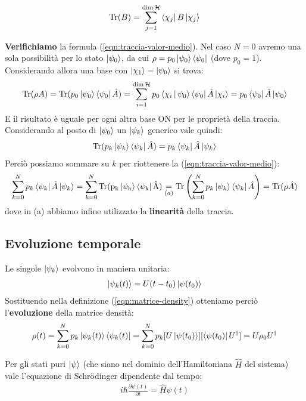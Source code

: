 \documentclass[../../InformazioneQuantistica.tex]{subfiles}
\begin{document}
\begin{align*}
\operatorname{Tr}(B)=\sum_{j=1}^{\operatorname{dim}\mathcal{H}} \Bra{\chi_j}B\Ket{\chi_j}
\end{align*}
\begin{expl}
\textbf{Verifichiamo} la formula (\ref{eqn:traccia-valor-medio}). Nel caso $N=0$ avremo una sola possibilità per lo stato $\Ket{\psi_0}$, da cui $\rho = p_0\Ket{\psi_0}\Bra{\psi_0}$ (dove $p_0=1$). Considerando allora una base con $\Ket{\chi_1} = \Ket{\psi_0}$ si trova:
\begin{align*}
\operatorname{Tr}(\rho A) =
\operatorname{Tr}(p_0\Ket{\psi_0}\Bra{\psi_0}\hat{A})=\sum_{i=1}^{\operatorname{dim}\mathcal{H}}p_0 \Braket{\chi_i|\psi_0}\Bra{\psi_0}\hat{A}\Ket{\chi_i}=p_0 \Bra{\psi_0}\hat{A}\Ket{\psi_0}
\end{align*} 
E il risultato è uguale per ogni altra base ON per le proprietà della traccia. Considerando al posto di $\Ket{\psi_0}$ un $\Ket{\psi_k}$ generico vale quindi:
\begin{align*}
\operatorname{Tr}(p_k\Ket{\psi_k}\Bra{\psi_k}\hat{A})=p_k\Bra{\psi_k}\hat{A}\Ket{\psi_k}
\end{align*}
Perciò possiamo sommare su $k$ per riottenere la (\ref{eqn:traccia-valor-medio}):
\begin{align*}
\sum_{k=0}^N p_k \Bra{\psi_k}\hat{A}\Ket{\psi_k}=\sum_{k=0}^N\operatorname{Tr(p_k\Ket{\psi_k}\Bra{\psi_k}\hat{A}}) \underset{(a)}{=} \operatorname{Tr}\left(\sum_{k=0}^{N} p_k \Ket{\psi_k}\Bra{\psi_k}\hat{A}\right)=\operatorname{Tr}(\rho \hat{A})
\end{align*}
dove in (a) abbiamo infine utilizzato la \textbf{linearità} della traccia.
\end{expl}

\subsection{Evoluzione temporale}
Le singole $\Ket{\psi_k}$ evolvono in maniera unitaria:
\begin{align*}
\Ket{\psi_k(t)} = U(t-t_0) \Ket{\psi(t_0)}
\end{align*}
Sostituendo nella definizione (\ref{eqn:matrice-density}) otteniamo perciò l'\textbf{evoluzione} della matrice densità:
\begin{align*}
\rho(t) = \sum_{k=0}^N p_k \Ket{\psi_k(t)}\Bra{\psi_k(t)} = \sum_{k=0}^N p_k [U\Ket{\psi(t_0)}][\Bra{\psi(t_0)}U^\dag] = U \rho_0 U^\dag
\end{align*}

Per gli stati puri $\Ket{\psi}$ (che siano nel dominio dell'Hamiltoniana $\hat{H}$ del sistema) vale l'equazione di Schr\"odinger dipendente dal tempo:
\begin{align}
i\hbar \frac{\partial \psi(t)}{\partial t} = \hat{H}\psi(t)
\label{eqn:schrody-temp}
\end{align}
\end{document}
